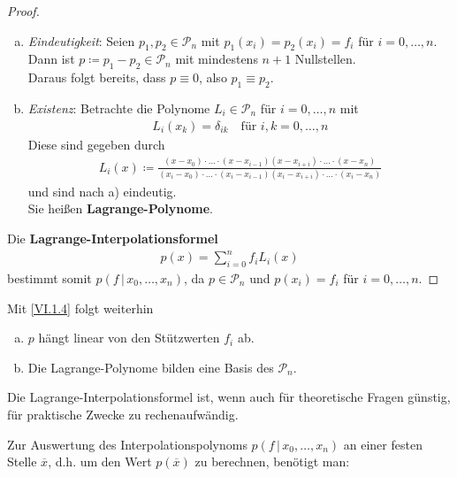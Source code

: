 \documentclass[ngerman,fontsize=11pt, paper=a4, parskip=half, titlepage=true, toc=bib]{scrbook}
\theoremstyle{definition}
\theoremstyle{plain}
\begin{document}
\begin{proof}~
  \begin{enumerate}[a)]
  \item \textit{Eindeutigkeit}:
    Seien $p_1, p_2\in \mathcal{P}_n$ mit $p_1(x_i)=p_2(x_i) = f_i$
    für $i=0, \dots, n$.
    Dann ist $p\coloneqq p_1-p_2 \in\mathcal{P}_n$
    mit mindestens $n+1$ Nullstellen. \\
    Daraus folgt bereits, dass $p\equiv 0$, also $p_1\equiv p_2$.

  \item \textit{Existenz}: 
    Betrachte die Polynome $L_i\in\mathcal{P}_n$ für $i=0, \dots, n$
    mit 
    \begin{gather}
      L_i(x_k) = \delta_{ik}\quad \text{für } i,k=0, \dots, n 
      \label{VI.1.2}
    \end{gather}
    Diese sind gegeben durch
    \begin{gather}
      L_i(x) \coloneqq \frac{(x-x_0)\cdot \dotsc
        \cdot (x-x_{i-1})(x-x_{i+i}) \cdot \dotsc
        \cdot (x-x_n)}
      {(x_i-x_0)\cdot \dots
        \cdot (x_i-x_{i-1})(x_i-x_{i+i}) \cdot \dotsc
        \cdot (x_i-x_n)}
      \label{VI.1.3}
    \end{gather}
    und sind nach a) eindeutig. \\
    Sie heißen \textbf{Lagrange-Polynome}.
  \end{enumerate}
  Die \textbf{Lagrange-Interpolationsformel}
  \begin{gather}
    p(x) = \sum_{i=0}^{n} f_iL_i(x)
    \label{VI.1.4}
  \end{gather}
  bestimmt somit $p(f\,|\,x_0, \dots, x_n)$,
  da $p\in\mathcal{P}_n$ und $p(x_i) = f_i$ für $i=0,\dots, n$.
\end{proof}

Mit \eqref{VI.1.4} folgt weiterhin
\begin{enumerate}[a)]
\item $p$ hängt linear von den Stützwerten $f_i$ ab.
\item Die Lagrange-Polynome bilden eine Basis des $\mathcal{P}_n$.
\end{enumerate}

Die Lagrange-Interpolationsformel ist,
wenn auch für theoretische Fragen günstig,
für praktische Zwecke zu rechenaufwändig.

Zur Auswertung des Interpolationspolynoms $p(f\,|\,x_0,\dots, x_n)$
an einer festen Stelle $\overline{x}$, d.h.
um den Wert $p(\overline{x} ) $ zu berechnen,
benötigt man:
\end{document}
